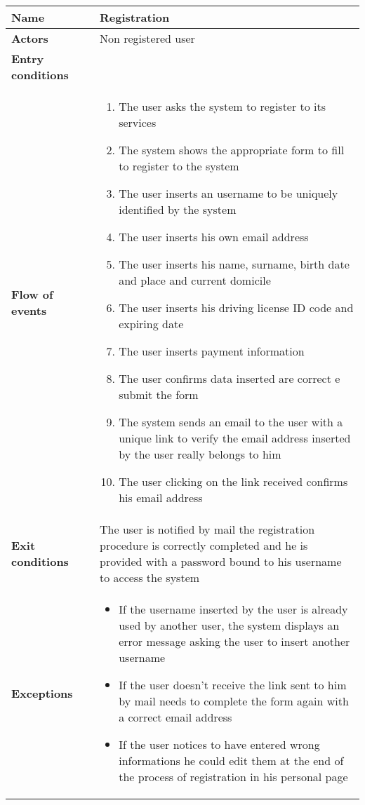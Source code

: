 \begin{tabular}{p{0.25\linewidth}p{0.75\linewidth}}
\toprule
\textbf{Name} & \textbf{Registration} \\
\midrule
\textbf{Actors} & Non registered user \\
\midrule
\textbf{Entry conditions} & \\
\midrule
\textbf{Flow of events} & 
\begin{enumerate}
	\item The user asks the system to register to its services
	\item The system shows the appropriate form to fill to register to the system
	\item The user inserts an username to be uniquely identified by the system
	\item The user inserts his own email address
	\item The user inserts his name, surname, birth date and place and current domicile
	\item The user inserts his driving license ID code and expiring date
	\item The user inserts payment information
	\item The user confirms data inserted are correct e submit the form
	\item The system sends an email to the user with a unique link to verify the email address inserted by the user really belongs to him
	\item The user clicking on the link received confirms his email address
\end{enumerate} \\
\midrule
\textbf{Exit conditions} & The user is notified by mail the registration procedure is correctly completed and he is provided with a password bound to his username to access the system\\
\midrule
\textbf{Exceptions} & 
\begin{itemize}
	\item If the username inserted by the user is already used by another user, the system displays an error message asking the user to insert another username
	\item If the user doesn't receive the link sent to him by mail needs to complete the form again with a correct email address
	\item If the user notices to have entered wrong informations he could edit them at the end of the process of registration in his personal page
\end{itemize} \\
\bottomrule
\end{tabular}

